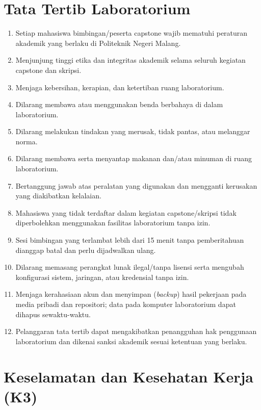 \documentclass[12pt,a4paper]{report}
\begin{document}
\chapter{Tata Tertib Laboratorium}
\label{chap:tatib}

\begin{enumerate}
\item Setiap mahasiswa bimbingan/peserta capstone wajib mematuhi peraturan akademik yang berlaku di Politeknik Negeri Malang.
\item Menjunjung tinggi etika dan integritas akademik selama seluruh kegiatan capstone dan skripsi.
\item Menjaga kebersihan, kerapian, dan ketertiban ruang laboratorium.
\item Dilarang membawa atau menggunakan benda berbahaya di dalam laboratorium.
\item Dilarang melakukan tindakan yang merusak, tidak pantas, atau melanggar norma.
\item Dilarang membawa serta menyantap makanan dan/atau minuman di ruang laboratorium.
\item Bertanggung jawab atas peralatan yang digunakan dan mengganti kerusakan yang diakibatkan kelalaian.
\item Mahasiswa yang tidak terdaftar dalam kegiatan capstone/skripsi tidak diperbolehkan menggunakan fasilitas laboratorium tanpa izin.
\item Sesi bimbingan yang terlambat lebih dari 15 menit tanpa pemberitahuan dianggap batal dan perlu dijadwalkan ulang.
\item Dilarang memasang perangkat lunak ilegal/tanpa lisensi serta mengubah konfigurasi sistem, jaringan, atau kredensial tanpa izin.
\item Menjaga kerahasiaan akun dan menyimpan (\emph{backup}) hasil pekerjaan pada media pribadi dan repositori; data pada komputer laboratorium dapat dihapus sewaktu-waktu.
\item Pelanggaran tata tertib dapat mengakibatkan penangguhan hak penggunaan laboratorium dan dikenai sanksi akademik sesuai ketentuan yang berlaku.
\end{enumerate}

\chapter{Keselamatan dan Kesehatan Kerja (K3)}
\end{document}
